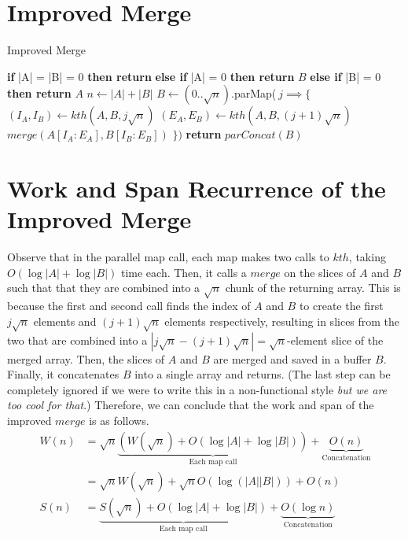 \section{Improved Merge}

\begin{algorithm}
\caption{Improved Merge}
\begin{algorithmic}[1]

	\State \textbf{if} |A| = |B| = 0 \textbf{then return}
	\State \textbf{else if} |A| = 0 \textbf{then return} $B$
	\State \textbf{else if} |B| = 0 \textbf{then return} $A$
	\State $n \gets |A| + |B|$
	\State $B \gets (0..\sqrt{n})$.parMap($\ j \implies \{$
		\State \qquad $(I_A, I_B) \gets kth(A, B, j\sqrt{n})$
		\State \qquad $(E_A, E_B) \gets kth(A, B, (j+1)\sqrt{n})$
		\State \qquad $merge(A[I_A:E_A], B[I_B:E_B])$
	\State $\})$
	\State \textbf{return} $parConcat(B)$
\EndProcedure

\end{algorithmic}
\end{algorithm}

\section{Work and Span Recurrence of the Improved Merge}

Observe that in the parallel map call, each map makes two calls to $kth$, taking $O(\log|A| + \log|B|)$ time each. Then, it calls a $merge$ on the slices of $A$ and $B$ such that that they are combined into a $\sqrt{n}$ chunk of the returning array. This is because the first and second call finds the index of $A$ and $B$ to create the first $j\sqrt{n}$ elements and $(j+1)\sqrt{n}$ elements respectively, resulting in slices from the two that are combined into a $|j\sqrt{n} - (j+1)\sqrt{n}| = \sqrt{n}$-element slice of the merged array. Then, the slices of $A$ and $B$ are merged and saved in a buffer $B$. Finally, it concatenates $B$ into a single array and returns. (The last step can be completely ignored if we were to write this in a non-functional style \textit{but we are too cool for that}.) Therefore, we can conclude that the work and span of the improved $merge$ is as follows.
\[
\begin{aligned}
	W(n) &= \sqrt{n}\underbrace{(W(\sqrt{n}) + O(\log|A| + \log|B|))}_\text{Each map call} + \underbrace{O(n)}_\text{Concatenation} \\
		 &= \sqrt{n}W(\sqrt n) + \sqrt nO(\log(|A||B|)) + O(n) \\
	S(n) &= \underbrace{S(\sqrt{n}) + O(\log|A| + \log|B|)}_\text{Each map call} + \underbrace{O(\log n)}_\text{Concatenation}
\end{aligned}
\]


